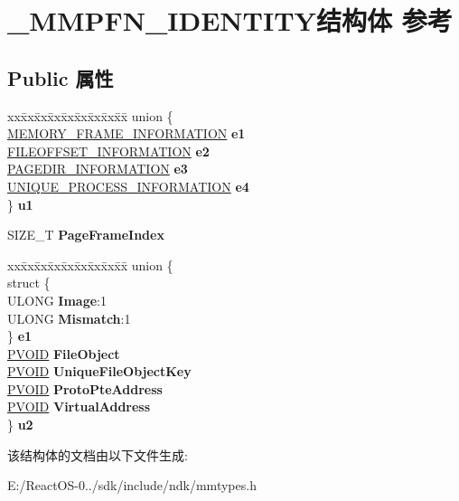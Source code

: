 \hypertarget{struct___m_m_p_f_n___i_d_e_n_t_i_t_y}{}\section{\+\_\+\+M\+M\+P\+F\+N\+\_\+\+I\+D\+E\+N\+T\+I\+T\+Y结构体 参考}
\label{struct___m_m_p_f_n___i_d_e_n_t_i_t_y}
\subsection*{Public 属性}
\begin{DoxyCompactItemize}
\item 
\mbox{\label{struct___m_m_p_f_n___i_d_e_n_t_i_t_y_a56e9c30bb7004942537efde759d5ad47}} 
\begin{tabbing}
xx\=xx\=xx\=xx\=xx\=xx\=xx\=xx\=xx\=\kill
union \{\\
\>\hyperlink{struct___m_e_m_o_r_y___f_r_a_m_e___i_n_f_o_r_m_a_t_i_o_n}{MEMORY\_FRAME\_INFORMATION} {\bfseries e1}\\
\>\hyperlink{struct___f_i_l_e_o_f_f_s_e_t___i_n_f_o_r_m_a_t_i_o_n}{FILEOFFSET\_INFORMATION} {\bfseries e2}\\
\>\hyperlink{struct___p_a_g_e_d_i_r___i_n_f_o_r_m_a_t_i_o_n}{PAGEDIR\_INFORMATION} {\bfseries e3}\\
\>\hyperlink{struct___u_n_i_q_u_e___p_r_o_c_e_s_s___i_n_f_o_r_m_a_t_i_o_n}{UNIQUE\_PROCESS\_INFORMATION} {\bfseries e4}\\
\} {\bfseries u1}\\

\end{tabbing}\item 
\mbox{\label{struct___m_m_p_f_n___i_d_e_n_t_i_t_y_ae4a6877a6b5dcdde513319ed82376173}} 
S\+I\+Z\+E\+\_\+T {\bfseries Page\+Frame\+Index}
\item 
\mbox{\label{struct___m_m_p_f_n___i_d_e_n_t_i_t_y_aa610252242037ff52852b11d84a4e33f}} 
\begin{tabbing}
xx\=xx\=xx\=xx\=xx\=xx\=xx\=xx\=xx\=\kill
union \{\\
\>struct \{\\
\>\>ULONG {\bfseries Image}:1\\
\>\>ULONG {\bfseries Mismatch}:1\\
\>\} {\bfseries e1}\\
\>\hyperlink{interfacevoid}{PVOID} {\bfseries FileObject}\\
\>\hyperlink{interfacevoid}{PVOID} {\bfseries UniqueFileObjectKey}\\
\>\hyperlink{interfacevoid}{PVOID} {\bfseries ProtoPteAddress}\\
\>\hyperlink{interfacevoid}{PVOID} {\bfseries VirtualAddress}\\
\} {\bfseries u2}\\

\end{tabbing}\end{DoxyCompactItemize}


该结构体的文档由以下文件生成\+:\begin{DoxyCompactItemize}
\item 
E\+:/\+React\+O\+S-\/0../sdk/include/ndk/mmtypes.\+h\end{DoxyCompactItemize}
